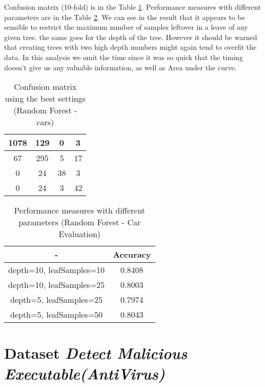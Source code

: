 \documentclass[11pt,a4paper,titlepage]{article}
\begin{document}
Confusion matrix (10-fold) is in the Table \ref{table:confusionMatrixRFcars}. Performance measures with different parameters are in the Table \ref{table:RFCarEvaln}.
We can see in the result that it appears to be sensible to restrict the maximum number of samples leftover in a leave of any given tree. the same goes for the depth of the tree. However it should be warned that creating trees with two high depth numbers might again tend to overfit the data.
In this analysis we omit the time since it was so quick that the timing doesn't give us any valuable information, as well as Area under the curve.

\begin{table}
  \centering
  \begin{tabular}{| c | c | c | c |}
    \hline
   	    1078  & 129  &   0  &  3 \\ \hline
          67  & 295 &   5  &  17 \\ \hline
          0  &  24  &  38   &  3 \\ \hline
          0  &  24  &  3   & 42 \\
    \hline
  \end{tabular}
  \caption{Confusion matrix using the best settings (Random Forest - cars)}
  \label{table:confusionMatrixRFcars}
  \end{table}
  
  \begin{table}
  \centering
  \begin{tabular}{| c | c |}
    \hline
     		-	   & Accuracy  	 \\ \hline
    depth=10, leafSamples=10 &  0.8408 	  	\\ \hline
    depth=10, leafSamples=25 & 	0.8003	   		\\ \hline
    depth=5, leafSamples=25 & 	 0.7974	  		\\ \hline
    depth=5, leafSamples=50 &   0.8043       	\\
    \hline
  \end{tabular}
  \caption{Performance measures with different parameters (Random Forest - Car Evaluation)}
  \label{table:RFCarEvaln}
  \end{table}
  

\section{Dataset \textit{Detect Malicious Executable(AntiVirus)}}
\end{document}
